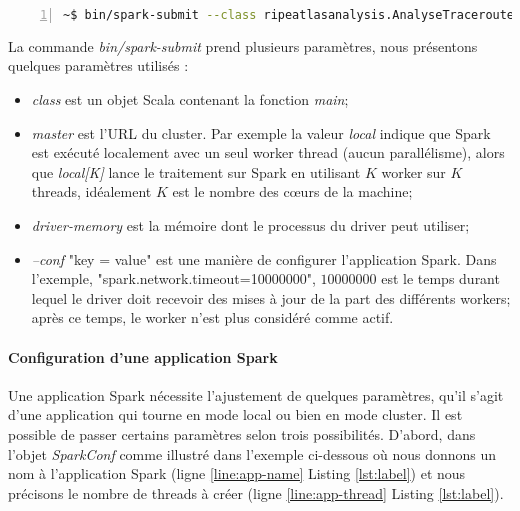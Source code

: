 \begin{lstlisting}[language=bash,firstnumber=1, caption={Exemple de la soumissions d'un traitement sur Spark},label={lst:submit}, basicstyle = \small,escapechar=|,numbers=left,
stepnumber=1]
~$ bin/spark-submit --class ripeatlasanalysis.AnalyseTraceroute     --master local --driver-memory 30G  --conf "spark.network.timeout=10000000" SparkExample-lowprints-0.0.5-SNAPSHOT-jar-with-dependencies.jar  1517961600  1518134400 3600 
\end{lstlisting}
La commande \textit{bin/spark-submit} prend plusieurs paramètres, nous présentons quelques paramètres utilisés :
\begin{itemize}
	\item \textit{class} est un objet Scala contenant la fonction \textit{main};
	\item  \textit{master} est l'URL du cluster. Par exemple la valeur \textit{local} indique que Spark est exécuté localement avec un seul worker thread (aucun parallélisme), alors que \textit{local[K]} lance le traitement sur Spark en utilisant $K$ worker sur $K$ threads, idéalement $K$ est le nombre des  c\oe{}urs de la machine;
	\item \textit{driver-memory} est la mémoire dont le processus du driver peut utiliser;
	
	\item  \textit{--conf} "key = value" est une manière de configurer l'application Spark. Dans l'exemple, "spark.network.timeout=10000000", $ 10000000 $ est le temps durant lequel le driver doit recevoir  des mises à jour de la part des différents workers; après ce temps, le worker n'est plus considéré comme actif.
\end{itemize}

\paragraph{Configuration d'une application  Spark}

Une application Spark nécessite l'ajustement de quelques paramètres, qu'il s'agit d'une application qui tourne en mode local ou bien en mode cluster. Il est possible de passer certains paramètres selon trois possibilités. D'abord, dans l'objet \textit{SparkConf} comme illustré dans l'exemple ci-dessous où nous donnons un nom à l'application Spark (ligne \ref{line:app-name} Listing \ref{lst:label}) et nous précisons le nombre de threads à créer (ligne \ref{line:app-thread} Listing \ref{lst:label}). 

